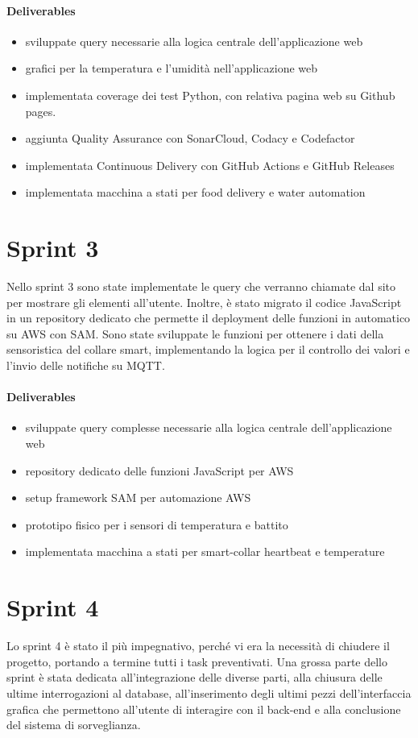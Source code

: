 \paragraph{Deliverables}
\begin{itemize}
    \item sviluppate query necessarie alla logica centrale dell'applicazione web
    \item grafici per la temperatura e l'umidità nell'applicazione web
    \item implementata coverage dei test Python, con relativa pagina web su Github pages. 
    \item aggiunta Quality Assurance con SonarCloud, Codacy e Codefactor
    \item implementata Continuous Delivery con GitHub Actions e GitHub Releases
    \item implementata macchina a stati per food delivery e water automation
\end{itemize}

\section{Sprint 3}
Nello sprint 3 sono state implementate le query che verranno chiamate dal sito per mostrare gli elementi all'utente. Inoltre, è stato migrato il codice JavaScript in un repository dedicato che permette il deployment delle funzioni in automatico su AWS con SAM. Sono state sviluppate le funzioni per ottenere i dati della sensoristica del collare smart, implementando la logica per il controllo dei valori e l'invio delle notifiche su MQTT.
\paragraph{Deliverables}
\begin{itemize}
    \item sviluppate query complesse necessarie alla logica centrale dell'applicazione web
    \item repository dedicato delle funzioni JavaScript per AWS
    \item setup framework SAM per automazione AWS
    \item prototipo fisico per i sensori di temperatura e battito
    \item implementata macchina a stati per smart-collar heartbeat e temperature
\end{itemize}

\section{Sprint 4}
Lo sprint 4 è stato il più impegnativo,  perché vi era la necessità di chiudere il progetto, portando a termine tutti i task preventivati.
Una grossa parte dello sprint è stata dedicata all'integrazione delle diverse parti, alla chiusura delle ultime interrogazioni al database, all'inserimento degli ultimi pezzi dell'interfaccia grafica che permettono all'utente di interagire con il back-end e alla conclusione del sistema di sorveglianza.
